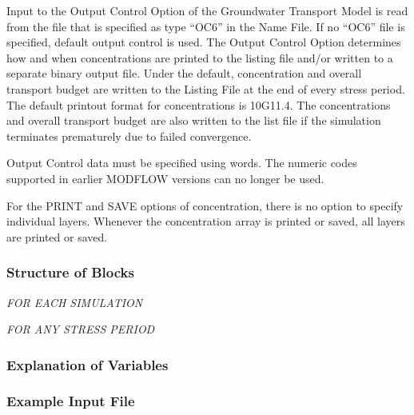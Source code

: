Input to the Output Control Option of the Groundwater Transport Model is read from the file that is specified as type ``OC6'' in the Name File. If no ``OC6'' file is specified, default output control is used. The Output Control Option determines how and when concentrations are printed to the listing file and/or written to a separate binary output file.  Under the default, concentration and overall transport budget are written to the Listing File at the end of every stress period. The default printout format for concentrations is 10G11.4.  The concentrations and overall transport budget are also written to the list file if the simulation terminates prematurely due to failed convergence.

Output Control data must be specified using words.  The numeric codes supported in earlier MODFLOW versions can no longer be used.

For the PRINT and SAVE options of concentration, there is no option to specify individual layers.  Whenever the concentration array is printed or saved, all layers are printed or saved.

\vspace{5mm}
\subsubsection{Structure of Blocks}
\vspace{5mm}

\noindent \textit{FOR EACH SIMULATION}

\vspace{5mm}
\noindent \textit{FOR ANY STRESS PERIOD}


\vspace{5mm}
\subsubsection{Explanation of Variables}
\begin{description}

\end{description}

\vspace{5mm}
\subsubsection{Example Input File}

